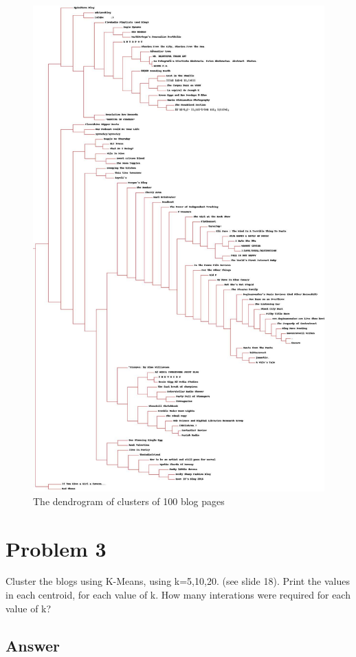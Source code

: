 \documentclass[12pt]{article}
\begin{document}
\begin{figure}
\centering
\includegraphics[width=5in]{blogclust.jpg}
\caption{The dendrogram of clusters of 100 blog pages}
\end{figure}
\pagebreak

\section*{Problem 3}

Cluster the blogs using K-Means, using k=5,10,20. (see slide
18).  Print the values in each centroid, for each value of k. How
many interations were required for each value of k?

\subsection*{Answer}
\end{document}
